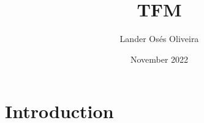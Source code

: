 \documentclass{article}
\title{TFM}
\author{Lander Osés Oliveira}
\date{November 2022}
\begin{document}
\maketitle

\section{Introduction}
\end{document}
